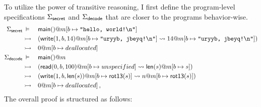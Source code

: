To utilize the power of
transitive reasoning,
I first define the
program-level specifications
$\Sigma_{ \mathsf{secret} }$ and $\Sigma_{ \mathsf{decode} }$
that are closer
to the  programs behavior-wise.
{\small
  \begin{align*}
    \Sigma_{ \mathsf{secret} } & \:\vDash\: &&
     \mathsf{main()} @m[b \mapsto \texttt{"hello, world!\textbackslash{}n"}] \\
    & \rightarrowtail &&
    ( \mathsf{write} (1, b, 14)@m [b \mapsto \texttt{"uryyb, jbeyq!\textbackslash{}n"}]
    \leadsto 14@m[b \mapsto \texttt{"uryyb, jbeyq!\textbackslash{}n"}]) \\
    & \rightarrowtail && 0@m[b \mapsto deallocated] \\
    \Sigma_{ \mathsf{decode} } & \:\vDash\ &&
     \mathsf{main()} @m \\
    & \rightarrowtail && (  \mathsf{read} (0, b, 100)@m[b \mapsto unspecified]
    \leadsto  \mathsf{len} (s)@m[b \mapsto s]) \\
    & \rightarrowtail && ( \mathsf{write} (1, b,  \mathsf{len} (s))@m[b\mapsto  \mathsf{rot13} (s)]
    \leadsto n@m[b\mapsto  \mathsf{rot13} (s)]) \\
    & \rightarrowtail && 0@m[b \mapsto deallocated]
    \,,
\end{align*}}
The overall proof is structured as follows:
